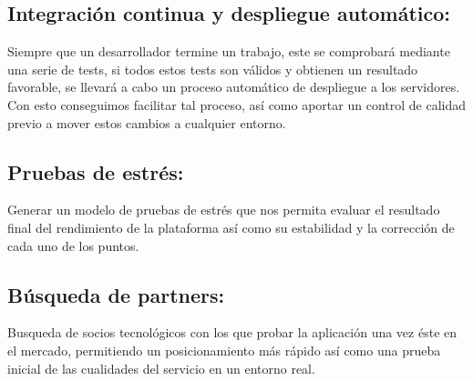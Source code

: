\subsection{Integración continua y despliegue automático:} Siempre que un
desarrollador termine un trabajo, este se comprobará mediante una serie de
tests, si todos estos tests son válidos y obtienen un resultado favorable, se
llevará a cabo un proceso automático de despliegue a los servidores. Con esto
conseguimos facilitar tal proceso, así como aportar un control de calidad previo
a mover estos cambios a cualquier entorno.

\subsection{Pruebas de estrés:} Generar un modelo de pruebas de estrés que nos
permita evaluar el resultado final del rendimiento de la plataforma así como su
estabilidad y la corrección de cada uno de los puntos.

\subsection{Búsqueda de partners:} Busqueda de socios tecnológicos con los que
probar la aplicación una vez éste en el mercado, permitiendo un posicionamiento
más rápido así como una prueba inicial de las cualidades del servicio en un
entorno real.






